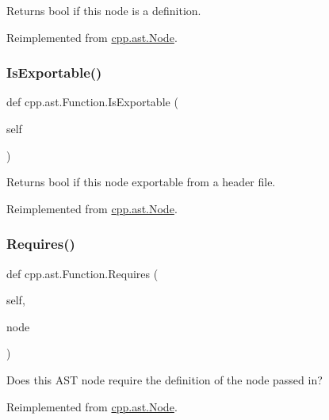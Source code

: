 \begin{DoxyVerb}Returns bool if this node is a definition.\end{DoxyVerb}
 

Reimplemented from \mbox{\hyperlink{classcpp_1_1ast_1_1_node_a684ee9a357168e7e07a24fc6812f66e6}{cpp.\+ast.\+Node}}.

\mbox{\label{classcpp_1_1ast_1_1_function_a85a073cd69116bc6191f379d69d10d72}} 
\subsubsection{\texorpdfstring{IsExportable()}{IsExportable()}}
{\footnotesize\ttfamily def cpp.\+ast.\+Function.\+Is\+Exportable (\begin{DoxyParamCaption}\item[{}]{self }\end{DoxyParamCaption})}

\begin{DoxyVerb}Returns bool if this node exportable from a header file.\end{DoxyVerb}
 

Reimplemented from \mbox{\hyperlink{classcpp_1_1ast_1_1_node_a313273874ccf578485006d4000128234}{cpp.\+ast.\+Node}}.

\mbox{\label{classcpp_1_1ast_1_1_function_a999e7b5e43517cd4d68b1aeea8a7d6e1}} 
\subsubsection{\texorpdfstring{Requires()}{Requires()}}
{\footnotesize\ttfamily def cpp.\+ast.\+Function.\+Requires (\begin{DoxyParamCaption}\item[{}]{self,  }\item[{}]{node }\end{DoxyParamCaption})}

\begin{DoxyVerb}Does this AST node require the definition of the node passed in?\end{DoxyVerb}
 

Reimplemented from \mbox{\hyperlink{classcpp_1_1ast_1_1_node_a31ae211f954a8c578ef16226df5ac8c8}{cpp.\+ast.\+Node}}.



